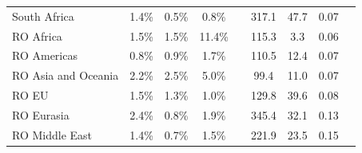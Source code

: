 \begin{center}
\begin{tabular}{l ccc c cc c c}
South Africa & 1.4\% & 0.5\% & 0.8\% && 317.1 & 47.7 & 0.07 \\
RO Africa & 1.5\% & 1.5\% & 11.4\% && 115.3 & 3.3 & 0.06 \\
RO Americas & 0.8\% & 0.9\% & 1.7\% && 110.5 & 12.4 & 0.07 \\
RO Asia and Oceania & 2.2\% & 2.5\% & 5.0\% && 99.4 & 11.0 & 0.07 \\
RO EU & 1.5\% & 1.3\% & 1.0\% && 129.8 & 39.6 & 0.08 \\
RO Eurasia & 2.4\% & 0.8\% & 1.9\% && 345.4 & 32.1 & 0.13 \\
RO Middle East & 1.4\% & 0.7\% & 1.5\% && 221.9 & 23.5 & 0.15 \\
\bottomrule
\end{tabular}
\end{center}
